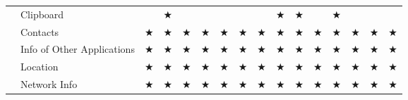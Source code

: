 \documentclass[sigconf,balance=false]{acmart}
\def\checkmark{{\footnotesize $\bigstar$}}
\begin{document}
\begin{table*}[h]
\begin{tabular}{p{3.0cm}p{4.7cm}llllllllllllll}
                                                                                                     &Clipboard                             &                      &\checkmark                           &                           &                            &                          &                       &                          &\checkmark                   &\checkmark                   &                          &\checkmark             &                       &                        &                                \\
                                                                                                     &Contacts                              &\checkmark            &\checkmark                           &\checkmark                 &\checkmark                  &\checkmark                &\checkmark             &\checkmark                &\checkmark                   &\checkmark                   &\checkmark                &\checkmark             &\checkmark             &\checkmark              &\checkmark                      \\
                                                                                                     &Info of Other Applications            &\checkmark            &\checkmark                           &\checkmark                 &\checkmark                  &\checkmark                &\checkmark             &\checkmark                &\checkmark                   &\checkmark                   &\checkmark                &\checkmark             &\checkmark             &\checkmark              &\checkmark                      \\
                                                                                                     &Location                              &\checkmark            &\checkmark                           &\checkmark                 &\checkmark                  &\checkmark                &\checkmark             &\checkmark                &\checkmark                   &\checkmark                   &\checkmark                &\checkmark             &\checkmark             &\checkmark              &\checkmark                      \\
                                                                                                     &Network Info                          &\checkmark            &\checkmark                           &\checkmark                 &\checkmark                  &\checkmark                &\checkmark             &\checkmark                &\checkmark                   &\checkmark                   &\checkmark                &\checkmark             &\checkmark             &\checkmark              &\checkmark                      \\

\end{tabular}
\end{table*}
\end{document}
